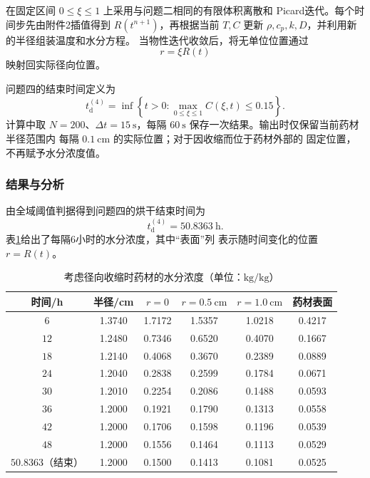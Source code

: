 \documentclass[12pt,a4paper]{article}
\renewcommand{\boxed}[1]{#1}
\begin{document}
在固定区间 $0\leq\xi\leq1$ 上采用与问题二相同的有限体积离散和
Picard迭代。每个时间步先由附件2插值得到 $R(t^{n+1})$，再根据当前
$T,C$ 更新 $\rho,c_p,k,D$，并利用新的半径组装温度和水分方程。
当物性迭代收敛后，将无单位位置通过
\begin{equation}
r=\xi R(t)
\label{eq:q4-back-transform}
\end{equation}
映射回实际径向位置。

问题四的结束时间定义为
\begin{equation}
\boxed{
t_{\mathrm d}^{(4)}
=\inf\left\{t>0:
\max_{0\leq\xi\leq1}C(\xi,t)\leq0.15\right\}
}.
\label{eq:q4-dry-time}
\end{equation}
计算中取 $N=200$、$\Delta t=15\ \mathrm{s}$，每隔
$60\ \mathrm{s}$ 保存一次结果。输出时仅保留当前药材半径范围内
每隔 $0.1\ \mathrm{cm}$ 的实际位置；对于因收缩而位于药材外部的
固定位置，不再赋予水分浓度值。

\subsubsection{结果与分析}

由全域阈值判据得到问题四的烘干结束时间为
\begin{equation}
\boxed{t_{\mathrm d}^{(4)}=50.8363\ \mathrm{h}}.
\label{eq:q4-result-time}
\end{equation}
表\ref{tab:q4-moisture}给出了每隔6小时的水分浓度，其中“表面”列
表示随时间变化的位置 $r=R(t)$。

\begin{table}[H]
\centering
\caption{考虑径向收缩时药材的水分浓度（单位：$\mathrm{kg/kg}$）}
\label{tab:q4-moisture}
\begin{tabular}{cccccc}
\toprule
时间/h & 半径/cm & $r=0$ & $r=0.5\ \mathrm{cm}$
& $r=1.0\ \mathrm{cm}$ & 药材表面\\
\midrule
$6$  & 1.3740 & 1.7172 & 1.5357 & 1.0218 & 0.4217\\
$12$ & 1.2480 & 0.7346 & 0.6520 & 0.4070 & 0.1667\\
$18$ & 1.2140 & 0.4068 & 0.3670 & 0.2389 & 0.0889\\
$24$ & 1.2040 & 0.2838 & 0.2599 & 0.1784 & 0.0671\\
$30$ & 1.2010 & 0.2254 & 0.2086 & 0.1488 & 0.0593\\
$36$ & 1.2000 & 0.1921 & 0.1790 & 0.1313 & 0.0558\\
$42$ & 1.2000 & 0.1706 & 0.1598 & 0.1196 & 0.0539\\
$48$ & 1.2000 & 0.1556 & 0.1464 & 0.1113 & 0.0529\\
$50.8363$（结束） & 1.2000 & 0.1500 & 0.1413 & 0.1081 & 0.0525\\
\bottomrule
\end{tabular}
\end{table}
\end{document}
